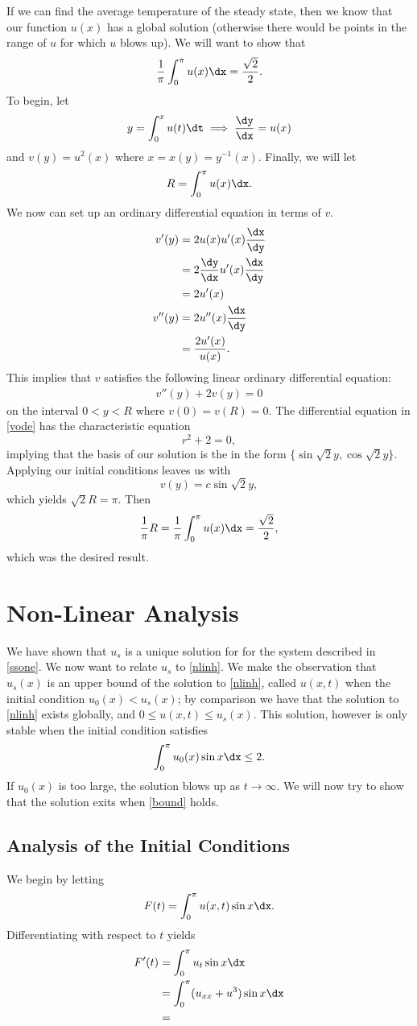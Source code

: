 \documentclass{hw}
\begin{document}
If we can find the average temperature of the steady state, then we know that our function $u(x)$
has a global solution (otherwise there would be points in the range of $u$ for which $u$ blows up).
We will want to show that
\[
{1\over\pi}\int_{0}^{\pi}u(x)\dx={\sqrt{2}\over2}.
\]
To begin, let
\[
y=\int_{0}^{x}u(t)\dt \implies {\dy\over\dx} = u(x)
\]
and $v(y)=u^{2}(x)$ where $x=x(y)=y^{-1}(x)$. Finally, we will let
\[
R=\int_{0}^{\pi}u(x)\dx.
\]
We now can set up an ordinary differential equation in terms of $v$.
\begin{align*}
v'(y)&=2u(x)u'(x){\dx\over\dy}\\
&= 2{\dy\over\dx}u'(x){\dx\over\dy}\\
&= 2u'(x)\\
v''(y)&= 2u''(x){\dx\over\dy}\\
&= {2u'(x)\over u(x)}.
\end{align*}
This implies that $v$ satisfies the following linear ordinary differential equation:
\begin{gather}\label{vode}
v''(y)+2v(y)=0
\end{gather}
on the interval $0<y<R$ where $v(0)=v(R)=0$. The differential equation in \eqref{vode} has the
characteristic equation
\[
r^{2}+2=0,
\]
implying that the basis of our solution is the in the form $\{\sin{\sqrt{2}y},\cos{\sqrt{2}y}\}$.
Applying our initial conditions leaves us with
\[
v(y)=c\sin{\sqrt{2}y},
\]
which yields $\sqrt{2}R=\pi$. Then
\[
{1\over\pi}R={1\over\pi}\int_{0}^{\pi}u(x)\dx={\sqrt{2}\over2},
\]
which was the desired result.

\section{Non-Linear Analysis}

We have shown that $u_{s}$ is a unique solution for for the system described in \eqref{ssone}. We now
want to relate $u_{s}$ to \eqref{nlinh}. We make the observation that $u_{s}(x)$ is an upper bound
of the solution to \eqref{nlinh}, called $u(x,t)$ when the initial condition $u_{0}(x)<u_{s}(x)$; by
comparison we have that the solution to \eqref{nlinh} exists globally, and
$0\leq u(x,t)\leq u_{s}(x)$. This solution, however is only stable when the initial condition
satisfies
\begin{equation}\label{bound}
\int_{0}^{\pi}u_{0}(x)\sin{x}\dx\leq2.
\end{equation}
If $u_{0}(x)$ is too large, the solution blows up as $t\to\infty$. We will now try to show that the
solution exits when \eqref{bound} holds.

\subsection{Analysis of the Initial Conditions}
We begin by letting
\[
F(t)=\int_{0}^{\pi}u(x,t)\sin{x}\dx.
\]
Differentiating with respect to $t$ yields
\begin{align*}
F'(t)&=\int_{0}^{\pi}u_{t}\sin{x}\dx\\
&=\int_{0}^{\pi}(u_{xx}+u^{3})\sin{x}\dx\\
&=
\end{align*}
\end{document}
